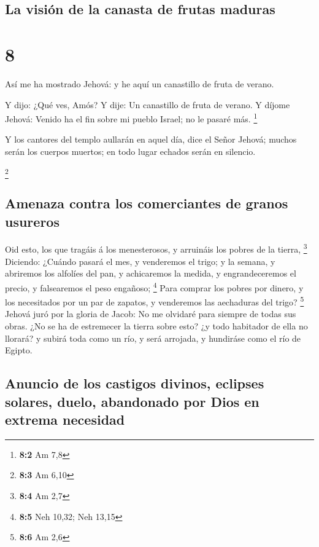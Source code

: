 \hypertarget{la-visiuxf3n-de-la-canasta-de-frutas-maduras}{%
\subsection{La visión de la canasta de frutas
maduras}\label{la-visiuxf3n-de-la-canasta-de-frutas-maduras}}

\hypertarget{section-7}{%
\section{8}\label{section-7}}

 Así me ha mostrado Jehová: y he aquí un canastillo de
fruta de verano.

 Y dijo: ¿Qué ves, Amós? Y dije: Un canastillo de fruta de
verano. Y díjome Jehová: Venido ha el fin sobre mi pueblo Israel; no le
pasaré más. \footnote{\textbf{8:2} Am 7,8}

 Y los cantores del templo aullarán en aquel día, dice el
Señor Jehová; muchos serán los cuerpos muertos; en todo lugar echados
serán en silencio.

\footnote{\textbf{8:3} Am 6,10}

\hypertarget{amenaza-contra-los-comerciantes-de-granos-usureros}{%
\subsection{Amenaza contra los comerciantes de granos
usureros}\label{amenaza-contra-los-comerciantes-de-granos-usureros}}

 Oid esto, los que tragáis á los menesterosos, y arruináis
los pobres de la tierra, \footnote{\textbf{8:4} Am 2,7} 
Diciendo: ¿Cuándo pasará el mes, y venderemos el trigo; y la semana, y
abriremos los alfolíes del pan, y achicaremos la medida, y
engrandeceremos el precio, y falsearemos el peso engañoso; \footnote{\textbf{8:5}
  Neh 10,32; Neh 13,15}  Para comprar los pobres por
dinero, y los necesitados por un par de zapatos, y venderemos las
aechaduras del trigo? \footnote{\textbf{8:6} Am 2,6} 
Jehová juró por la gloria de Jacob: No me olvidaré para siempre de todas
sus obras.  ¿No se ha de estremecer la tierra sobre esto?
¿y todo habitador de ella no llorará? y subirá toda como un río, y será
arrojada, y hundiráse como el río de Egipto.

\hypertarget{anuncio-de-los-castigos-divinos-eclipses-solares-duelo-abandonado-por-dios-en-extrema-necesidad}{%
\subsection{Anuncio de los castigos divinos, eclipses solares, duelo,
abandonado por Dios en extrema
necesidad}\label{anuncio-de-los-castigos-divinos-eclipses-solares-duelo-abandonado-por-dios-en-extrema-necesidad}}

